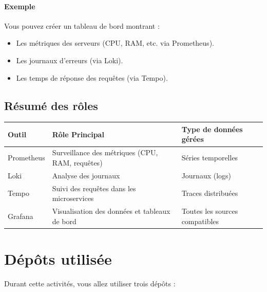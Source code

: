 \documentclass[french, 12pt]{article}%
\newcommand{\itemE}{\item[$\bullet$]}
\begin{document}
\paragraph{Exemple}
Vous pouvez créer un tableau de bord montrant :
\begin{itemize}
    \itemE Les métriques des serveurs (CPU, RAM, etc. via Prometheus).
    \itemE Les journaux d'erreurs (via Loki).
    \itemE Les temps de réponse des requêtes (via Tempo).
\end{itemize}

\subsection{Résumé des rôles}


\footnotesize
\begin{center}

    \begin{tabular}{|l|l|l|}
        \hline
        \rowcolor{vert_capet}\textbf{Outil} & \textbf{Rôle Principal} & \textbf{Type de données gérées} \\ 
        \hline
        Prometheus & Surveillance des métriques (CPU, RAM, requêtes) & Séries temporelles \\ \hline
        Loki       & Analyse des journaux                             & Journaux (logs)   \\ \hline
        Tempo      & Suivi des requêtes dans les microservices       & Traces distribuées \\ \hline
        Grafana    & Visualisation des données et tableaux de bord  & Toutes les sources compatibles \\ \hline
        \hline
    \end{tabular}
\end{center}
\normalsize

\section{Dépôts utilisée}

Durant cette activités, vous allez utiliser trois dépôts : 
\end{document}
